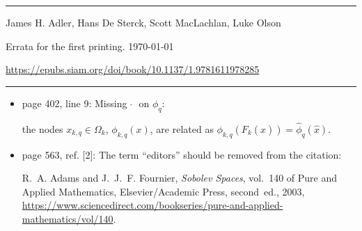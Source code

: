 \documentclass[mytheorems]{SIAMbook2019}
\newcommand{\erratafix}[1]{\medskip\newline\colorbox{latexgray}{\begin{minipage}[t]{0.80\textwidth}#1\end{minipage}}}
\begin{document}
\thispagestyle{empty}
\par\noindent\hfill\rule{\textwidth}{0.5pt}

\medskip
{}\newline
\noindent James H. Adler, Hans De Sterck, Scott MacLachlan, Luke Olson
\medskip

\noindent Errata for the first printing. \today

\medskip
\noindent \url{https://epubs.siam.org/doi/book/10.1137/1.9781611978285}

\par\noindent\hfill\rule{\textwidth}{0.5pt}

\medskip

\begin{itemize}
  \item  \textcolor{tab-red}{page 402, line 9:} Missing $\;\widehat{}\;$ on $\phi_q$:
    \erratafix{
    the nodes $x_{k,q}\in\Omega_k$, $\phi_{k,q}(x)$, are related as $\phi_{k,q}(F_k(\widehat{x})) = \widehat{\phi}_q(\widehat{x})$.
  }

\item \textcolor{tab-red}{page 563, ref. [2]:} The term ``editors'' should be removed from the citation:
    \erratafix{
      {\sc R.~A. Adams and J.~J.~F. Fournier}, {\em Sobolev Spaces}, vol.~140 of Pure and Applied Mathematics, Elsevier/Academic Press, second~ed., 2003, \url{https://www.sciencedirect.com/bookseries/pure-and-applied-mathematics/vol/140}.
    }
\end{itemize}
\end{document}
